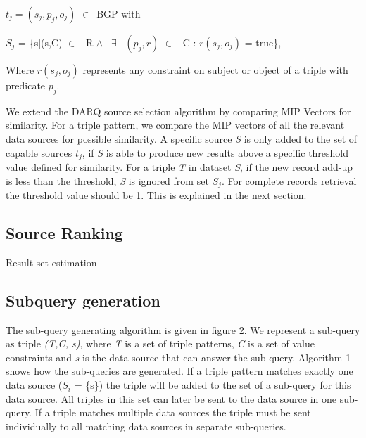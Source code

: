 \documentclass{sig-alternate}  %
\begin{document}
\begin{center}
$t_j = (s_j, p_j, o_j)$ $\in$\ BGP with 
\par\end{center}

\begin{center}
$S_j$ = \{s|(s,C) $\in$ \ R $\wedge$ \ $\exists$
\ $(p_j, r)$ $\in$ \ C : $r(s_j, o_j)$ = true\}, 
\par\end{center}
\begin{flushleft}
Where $r(s_j, o_j)$ represents any constraint
on subject or object of a triple with predicate $p_j$.
\par\end{flushleft}

We extend the DARQ source selection algorithm by comparing MIP Vectors
 for similarity. For a triple pattern, we compare the MIP
vectors of all the relevant data sources for possible similarity.
A specific source \emph{S} is only added to the set of capable sources $t_j$,
if \emph{S} is able to produce new results above a specific threshold value
defined for similarity. For a triple \emph{T} in dataset \emph{S}, if the new record add-up
is less than the threshold, \emph{S} is ignored from set $S_j$. For complete records retrieval the threshold value should be 1. This is explained in the next section.

\subsection{Source Ranking}
Result set estimation       
\subsection{Subquery generation}
 The sub-query generating algorithm is given in figure 2. We represent
a sub-query as triple \emph{(T,C, s)}, where \emph{T} is a set of triple patterns,
\emph{C} is a set of value constraints and \emph{s} is the data source that can
answer the sub-query. Algorithm 1 shows how the sub-queries are generated.
If a triple pattern matches exactly one data source ($S_i$
= \{s\}) the triple will be added to the set of a sub-query for this
data source. All triples in this set can later be sent to the data
source in one sub-query. If a triple matches multiple data sources
the triple must be sent individually to all matching data sources
in separate sub-queries.
\end{document}
